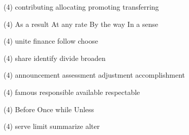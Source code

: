 \item
\begin{tasks}(4)
	\task contributing
	\task allocating
	\task promoting
	\task transferring
\end{tasks}
\item
\begin{tasks}(4)
	\task As a result
	\task At any rate
	\task By the way
	\task In a sense
\end{tasks}
\item
\begin{tasks}(4)
	\task unite
	\task finance
	\task follow
	\task choose
\end{tasks}
\item
\begin{tasks}(4)
	\task share
	\task identify
	\task divide
	\task broaden
\end{tasks}
\item
\begin{tasks}(4)
	\task announcement
	\task assessment
	\task adjustment
	\task accomplishment
\end{tasks}
\item
\begin{tasks}(4)
	\task famous
	\task responsible
	\task available
	\task respectable
\end{tasks}
\item
\begin{tasks}(4)
	\task Before
	\task Once
	\task while
	\task Unless
\end{tasks}
\item
\begin{tasks}(4)
	\task serve
	\task limit
	\task summarize
	\task alter
\end{tasks}